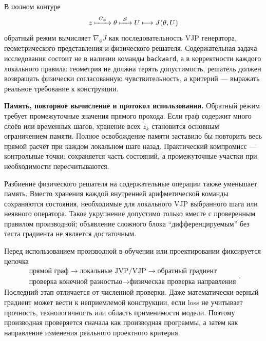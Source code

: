 \begin{connection}
В полном контуре
\begin{equation}
 z
 \xmapsto{\ G_\phi\ }
 \theta
 \xmapsto{\ \mathcal S\ }
 U
 \longmapsto
 J(\theta,U)
\end{equation}
обратный режим вычисляет $\nabla_\phi J$ как последовательность VJP генератора, геометрического представления и физического решателя. Содержательная задача исследования состоит не в наличии команды \texttt{backward}, а в корректности каждого локального правила: геометрия не должна терять допустимость, решатель должен возвращать физически согласованную чувствительность, а критерий --- выражать реальное требование к конструкции.
\end{connection}

\medskip
\noindent\textbf{Память, повторное вычисление и протокол использования.}
Обратный режим требует промежуточные значения прямого прохода. Если граф содержит много слоёв или временных шагов, хранение всех $z_k$ становится основным ограничением памяти. Полное освобождение памяти заставило бы повторить весь прямой расчёт при каждом локальном шаге назад. Практический компромисс --- контрольные точки: сохраняется часть состояний, а промежуточные участки при необходимости пересчитываются.

Разбиение физического решателя на содержательные операции также уменьшает память. Вместо хранения каждой внутренней арифметической команды сохраняются состояния, необходимые для локального VJP выбранного шага или неявного оператора. Такое укрупнение допустимо только вместе с проверенным правилом производной; объявление сложного блока ``дифференцируемым'' без теста градиента не является достаточным.

Перед использованием производной в обучении или проектировании фиксируется цепочка
\begin{equation}
 \boxed{
 \begin{gathered}
 \text{прямой граф}
 \to
 \text{локальные JVP/VJP}
 \to
 \text{обратный градиент}
 \\
 \text{проверка конечной разностью}
 \to
 \text{физическая проверка направления}
 \end{gathered}
 }.
\end{equation}
Последний этап отличается от численной проверки. Даже математически верный градиент может вести к неприемлемой конструкции, если loss не учитывает прочность, технологичность или область применимости модели. Поэтому производная проверяется сначала как производная программы, а затем как направление изменения реального проектного критерия.


